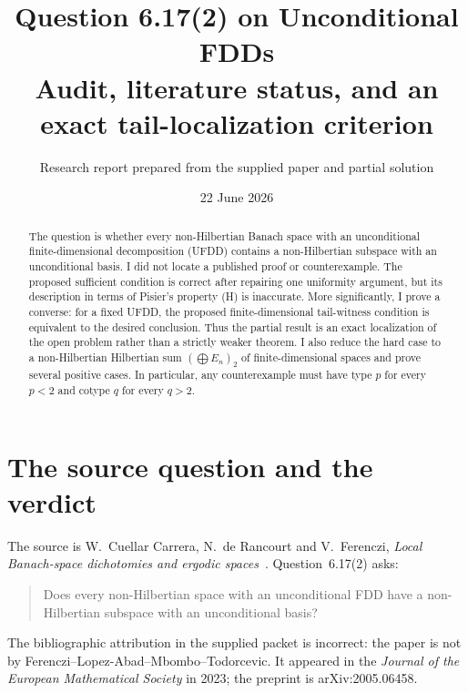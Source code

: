 \documentclass[11pt]{article}
\title{Question 6.17(2) on Unconditional FDDs\\
\large Audit, literature status, and an exact tail-localization criterion}
\author{Research report prepared from the supplied paper and partial solution}
\date{22 June 2026}
\theoremstyle{definition}
\begin{document}
\maketitle

\begin{abstract}
The question is whether every non-Hilbertian Banach space with an unconditional
finite-dimensional decomposition (UFDD) contains a non-Hilbertian subspace with
an unconditional basis.  I did not locate a published proof or counterexample.
The proposed sufficient condition is correct after repairing one uniformity
argument, but its description in terms of Pisier's property (H) is inaccurate.
More significantly, I prove a converse: for a fixed UFDD, the proposed
finite-dimensional tail-witness condition is equivalent to the desired
conclusion.  Thus the partial result is an exact localization of the open
problem rather than a strictly weaker theorem.  I also reduce the hard case to
a non-Hilbertian Hilbertian sum $(\bigoplus E_n)_2$ of finite-dimensional
spaces and prove several positive cases.  In particular, any counterexample
must have type $p$ for every $p<2$ and cotype $q$ for every $q>2$.
\end{abstract}

\section{The source question and the verdict}

The source is W.~Cuellar Carrera, N.~de Rancourt and V.~Ferenczi,
\emph{Local Banach-space dichotomies and ergodic spaces}~\cite{CDF}.
Question~6.17(2) asks:
\begin{quote}
Does every non-Hilbertian space with an unconditional FDD have a
non-Hilbertian subspace with an unconditional basis?
\end{quote}
The bibliographic attribution in the supplied packet is incorrect: the paper
is not by Ferenczi--Lopez-Abad--Mbombo--Todorcevic.  It appeared in the
\emph{Journal of the European Mathematical Society} in 2023; the preprint is
arXiv:2005.06458.
\end{document}
